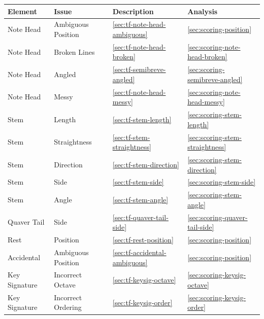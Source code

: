\begin{table}[H]
    \centering
    \begin{tabularx}{\textwidth}{ llll }
        \toprule

        Element & Issue & Description & Analysis \\
        \midrule
        Note Head       & Ambiguous Position     & \cref{sec:tf-note-head-ambiguous}              & \cref{sec:scoring-position} \\
        Note Head       & Broken Lines           & \cref{sec:tf-note-head-broken}            & \cref{sec:scoring-note-head-broken} \\
        Note Head       & Angled                 & \cref{sec:tf-semibreve-angled}            & \cref{sec:scoring-semibreve-angled} \\
        Note Head       & Messy                  & \cref{sec:tf-note-head-messy}             & \cref{sec:scoring-note-head-messy} \\
        Stem            & Length                 & \cref{sec:tf-stem-length}                 & \cref{sec:scoring-stem-length} \\
        Stem            & Straightness           & \cref{sec:tf-stem-straightness}           & \cref{sec:scoring-stem-straightness} \\
        Stem            & Direction              & \cref{sec:tf-stem-direction}              & \cref{sec:scoring-stem-direction} \\
        Stem            & Side                   & \cref{sec:tf-stem-side}                   & \cref{sec:scoring-stem-side} \\
        Stem            & Angle                  & \cref{sec:tf-stem-angle}                  & \cref{sec:scoring-stem-angle} \\
        Quaver Tail     & Side                   & \cref{sec:tf-quaver-tail-side}            & \cref{sec:scoring-quaver-tail-side} \\
        Rest            & Position               & \cref{sec:tf-rest-position}               & \cref{sec:scoring-position} \\
        Accidental      & Ambiguous Position     & \cref{sec:tf-accidental-ambiguous}        & \cref{sec:scoring-position} \\
        Key Signature   & Incorrect Octave       & \cref{sec:tf-keysig-octave}               & \cref{sec:scoring-keysig-octave} \\
        Key Signature   & Incorrect Ordering     & \cref{sec:tf-keysig-order}                & \cref{sec:scoring-keysig-order} \\

\end{tabularx}
\end{table}
